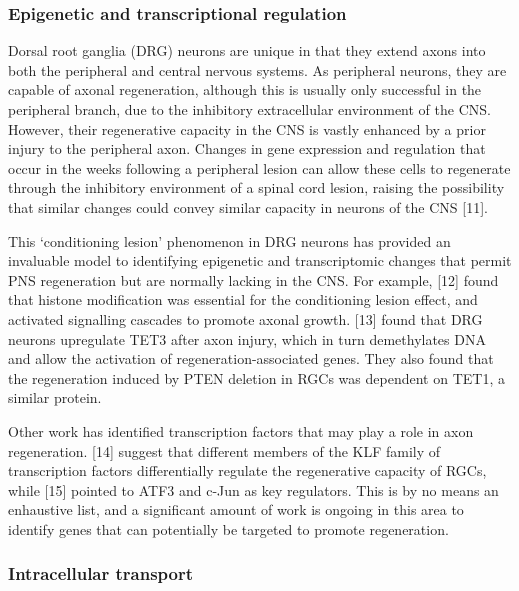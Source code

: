\documentclass[
  12pt,
  a4paper,
]{book}
\begin{document}
\hypertarget{epigenetic-and-transcriptional-regulation}{%
\subsubsection{Epigenetic and transcriptional regulation}\label{epigenetic-and-transcriptional-regulation}}

Dorsal root ganglia (DRG) neurons are unique in that they extend axons into both the peripheral and central nervous systems. As peripheral neurons, they are capable of axonal regeneration, although this is usually only successful in the peripheral branch, due to the inhibitory extracellular environment of the CNS. However, their regenerative capacity in the CNS is vastly enhanced by a prior injury to the peripheral axon. Changes in gene expression and regulation that occur in the weeks following a peripheral lesion can allow these cells to regenerate through the inhibitory environment of a spinal cord lesion, raising the possibility that similar changes could convey similar capacity in neurons of the CNS {[}11{]}.

This `conditioning lesion' phenomenon in DRG neurons has provided an invaluable model to identifying epigenetic and transcriptomic changes that permit PNS regeneration but are normally lacking in the CNS. For example, {[}12{]} found that histone modification was essential for the conditioning lesion effect, and activated signalling cascades to promote axonal growth. {[}13{]} found that DRG neurons upregulate TET3 after axon injury, which in turn demethylates DNA and allow the activation of regeneration-associated genes. They also found that the regeneration induced by PTEN deletion in RGCs was dependent on TET1, a similar protein.

Other work has identified transcription factors that may play a role in axon regeneration. {[}14{]} suggest that different members of the KLF family of transcription factors differentially regulate the regenerative capacity of RGCs, while {[}15{]} pointed to ATF3 and c-Jun as key regulators. This is by no means an enhaustive list, and a significant amount of work is ongoing in this area to identify genes that can potentially be targeted to promote regeneration.

\hypertarget{intracellular-transport}{%
\subsubsection{Intracellular transport}\label{intracellular-transport}}
\end{document}
